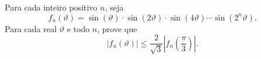 Para cada inteiro positivo \(n\), seja \[f_{n}(\vartheta)=\sin(\vartheta)\cdot \sin(2\vartheta) \cdot \sin(4\vartheta)\cdots \sin(2^{n}\vartheta).\]
Para cada real \(\vartheta\) e todo \(n\), prove que
\[|f_{n}(\vartheta)| \leq \frac{2}{\sqrt{3}}|f_{n}(\frac{\pi}{3})|.\]
